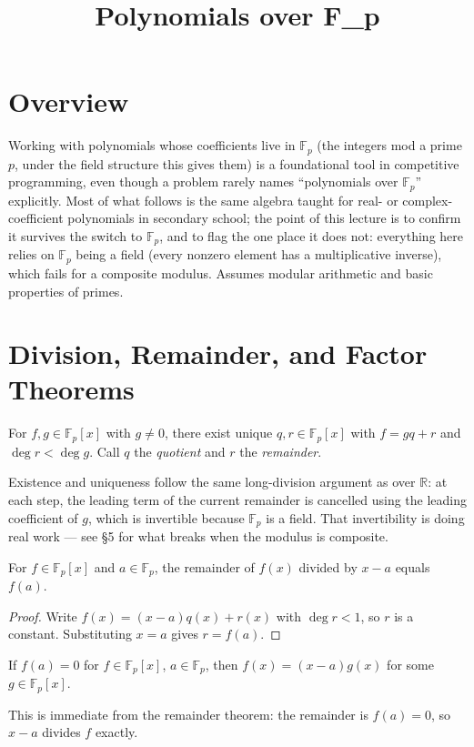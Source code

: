 \documentclass[11pt]{article}
\title{Polynomials over F\_p}
\author{}
\date{}
\begin{document}
\thispagestyle{fancy}


\section{Overview}
Working with polynomials whose coefficients live in $\mathbb{F}_p$ (the
integers mod a prime $p$, under the field structure this gives them) is a
foundational tool in competitive programming, even though a problem
rarely names ``polynomials over $\mathbb{F}_p$'' explicitly. Most of what
follows is the same algebra taught for real- or complex-coefficient
polynomials in secondary school; the point of this lecture is to confirm
it survives the switch to $\mathbb{F}_p$, and to flag the one place it
does not: everything here relies on $\mathbb{F}_p$ being a field (every
nonzero element has a multiplicative inverse), which fails for a
composite modulus. Assumes modular arithmetic and basic properties of
primes.

\section{Division, Remainder, and Factor Theorems}
\begin{definitionbox}
For $f, g \in \mathbb{F}_p[x]$ with $g \ne 0$, there exist unique
$q, r \in \mathbb{F}_p[x]$ with $f = gq + r$ and $\deg r < \deg g$. Call
$q$ the \emph{quotient} and $r$ the \emph{remainder}.
\end{definitionbox}
Existence and uniqueness follow the same long-division argument as over
$\mathbb{R}$: at each step, the leading term of the current remainder is
cancelled using the leading coefficient of $g$, which is invertible
because $\mathbb{F}_p$ is a field. That invertibility is doing real work
--- see \S5 for what breaks when the modulus is composite.

\begin{theorembox}
For $f \in \mathbb{F}_p[x]$ and $a \in \mathbb{F}_p$, the remainder of
$f(x)$ divided by $x - a$ equals $f(a)$.
\end{theorembox}
\begin{proof}
Write $f(x) = (x-a)q(x) + r(x)$ with $\deg r < 1$, so $r$ is a constant.
Substituting $x = a$ gives $r = f(a)$.
\end{proof}

\begin{theorembox}
If $f(a) = 0$ for $f \in \mathbb{F}_p[x]$, $a \in \mathbb{F}_p$, then
$f(x) = (x-a)g(x)$ for some $g \in \mathbb{F}_p[x]$.
\end{theorembox}
This is immediate from the remainder theorem: the remainder is $f(a)=0$,
so $x-a$ divides $f$ exactly.
\end{document}
